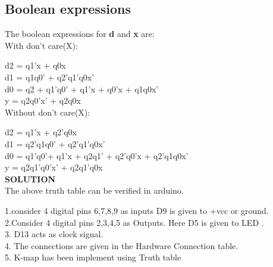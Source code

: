 \documentclass[10pt,a4paper]{report}
\begin{document}
\begin{multicols}{2}
 \raggedright\section*{\large Boolean expressions}
The boolean expressions for \textbf{d} and \textbf{x} are:\\
\vspace{2mm}
With don't care(X):\\\vspace{2mm}
\raggedright %
d2 = q1'x + q0x \\ \vspace{1mm}
d1 = q1q0' + q2'q1'q0x'\\\vspace{1mm}
d0 = q2 + q1'q0' + q1'x + q0'x + q1q0x'\\\vspace{1mm}
y = q2q0'x' + q2q0x\\ \vspace{2mm}
Without don't care(X):\\\vspace{2mm}
\raggedright

d2 = q1'x + q2'q0x \\ \vspace{1mm}
d1 = q2'q1q0' + q2'q1'q0x'\\\vspace{1mm}
d0 = q1'q0'+ q1'x + q2q1' + q2'q0'x + q2'q1q0x'\\\vspace{1mm}
y = q2q1'q0'x' + q2q1'q0x \\ \vspace{5mm}
 \textbf{SOLUTION}\\ \vspace{2mm}
 \vspace{2mm} The above truth table can be verified in arduino.\\ \vspace{2mm}
 
1.consider 4 digital pins 6,7,8,9 as inputs D9 is given to +vcc or ground. \\ \vspace{1mm}2.Consider 4 digital pins 2,3,4,5 as Outputs. Here D5 is given to LED  .\\\vspace{1mm}3. D13 acts as clock signal. \\\vspace{1mm}4. The connections are given in the Hardware Connection table. \\ \vspace{1mm}5. K-map has been implement using Truth table \vspace{5mm}


\end{multicols}
\end{document}
